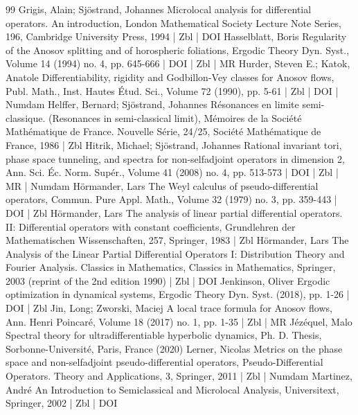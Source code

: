 \begin{thebibliography}{99}
Grigis, Alain; Sjöstrand, Johannes Microlocal analysis for differential operators. An introduction, London Mathematical Society Lecture Note Series, 196, Cambridge University Press, 1994 | Zbl | DOI
Hasselblatt, Boris Regularity of the Anosov splitting and of horospheric foliations, Ergodic Theory Dyn. Syst., Volume 14 (1994) no. 4, pp. 645-666 | DOI | Zbl | MR
Hurder, Steven E.; Katok, Anatole Differentiability, rigidity and Godbillon-Vey classes for Anosov flows, Publ. Math., Inst. Hautes Étud. Sci., Volume 72 (1990), pp. 5-61 | Zbl | DOI | Numdam
Helffer, Bernard; Sjöstrand, Johannes Résonances en limite semi-classique. (Resonances in semi-classical limit), Mémoires de la Société Mathématique de France. Nouvelle Série, 24/25, Société Mathématique de France, 1986 | Zbl
Hitrik, Michael; Sjöstrand, Johannes Rational invariant tori, phase space tunneling, and spectra for non-selfadjoint operators in dimension 2, Ann. Sci. Éc. Norm. Supér., Volume 41 (2008) no. 4, pp. 513-573 | DOI | Zbl | MR | Numdam
Hörmander, Lars The Weyl calculus of pseudo-differential operators, Commun. Pure Appl. Math., Volume 32 (1979) no. 3, pp. 359-443 | DOI | Zbl
Hörmander, Lars The analysis of linear partial differential operators. II: Differential operators with constant coefficients, Grundlehren der Mathematischen Wissenschaften, 257, Springer, 1983 | Zbl
Hörmander, Lars The Analysis of the Linear Partial Differential Operators I: Distribution Theory and Fourier Analysis. Classics in Mathematics, Classics in Mathematics, Springer, 2003 (reprint of the 2nd edition 1990) | Zbl | DOI
Jenkinson, Oliver Ergodic optimization in dynamical systems, Ergodic Theory Dyn. Syst. (2018), pp. 1-26 | DOI | Zbl
Jin, Long; Zworski, Maciej A local trace formula for Anosov flows, Ann. Henri Poincaré, Volume 18 (2017) no. 1, pp. 1-35 | Zbl | MR
Jézéquel, Malo Spectral theory for ultradifferentiable hyperbolic dynamics, Ph. D. Thesis, Sorbonne-Université, Paris, France (2020)
Lerner, Nicolas Metrics on the phase space and non-selfadjoint pseudo-differential operators, Pseudo-Differential Operators. Theory and Applications, 3, Springer, 2011 | Zbl | Numdam
Martinez, André An Introduction to Semiclassical and Microlocal Analysis, Universitext, Springer, 2002 | Zbl | DOI

\end{thebibliography}
